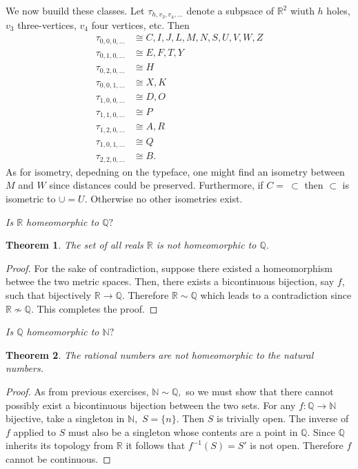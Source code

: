\documentclass[letter]{article}
\newtheorem{theorem}{Theorem}
\newenvironment{menumerate}{%
  \edef\backupindent{\the\parindent}%
  \enumerate%
  \setlength{\parindent}{\backupindent}%
}{\endenumerate}
\begin{document}
\begin{menumerate}
		We now buuild these classes. Let $\tau_{h,v_3,v_4,\dots}$ denote a subpsace of $\mathbb{R}^2$ wiuth $h$ holes, $v_3$ three-vertices, $v_4$ four vertices, etc. Then
		\begin{equation}
			\begin{aligned}
				\tau_{0,0,0,\dots} &\cong C,I,J,L,M,N,S,U,V,W,Z\\
				\tau_{0,1,0,\dots} &\cong E,F,T,Y \\
				\tau_{0,2,0,\dots} &\cong H \\ 
				\tau_{0,0,1,\dots} &\cong X,K \\
				\tau_{1,0,0,\dots} &\cong D,O \\
				\tau_{1,1,0,\dots} &\cong P \\
				\tau_{1,2,0,\dots} &\cong A,R\\
				\tau_{1,0,1,\dots} &\cong Q \\
				\tau_{2,2,0,\dots} &\cong B.
			\end{aligned}
		\end{equation}
		As for isometry, depedning on the typeface, one might find an isometry between $M$ and $W$ since distances could be preserved. Furthermore, if $C =\  \subset$ then $\subset$ is isometric to $\cup = U$. Otherwise no other isometries exist.
		\item  \textit{Is $\mathbb{R}$ homeomorphic to $\mathbb{Q}?$}
			\begin{theorem}
				The set of all reals $\mathbb{R}$ is not homeomorphic to $\mathbb{Q}$.
			\end{theorem}
			\begin{proof}
				For the sake of contradiction, suppose there existed a homeomorphism betwee the two metric spaces. Then, there exists a bicontinuous bijection, say $f$, such that bijectively $\mathbb{R}\to\mathbb{Q}$. Therefore $\mathbb{R} \sim \mathbb{Q}$ which leads to a contradiction since $\mathbb{R}\nsim\mathbb{Q}.$ This completes the proof.
			\end{proof}
		\item \textit{Is $\mathbb{Q}$ homeomorphic to $\mathbb{N}?$ }  
		\begin{theorem}
			The rational numbers are not homeomorphic to the natural numbers.
		\end{theorem}
		\begin{proof}
			As from previous exercises, $\mathbb{N} \sim \mathbb{Q},$ so we must show that there cannot possibly exist a bicontinuous bijection between the two sets. For any $f: \mathbb{Q} \to \mathbb{N}$ bijective,
			take a singleton in $\mathbb{N},$ $S= \{n\}.$ Then $S$ is trivially open. The inverse of $f$ applied to $S$ must also be a singleton whose contents are a point in $\mathbb{Q}.$ Since $\mathbb{Q}$ inherits its topology from $\mathbb{R}$ it follows that $f^{-1}(S) = S'$ is not open. Therefore $f$ cannot be continuous.


\end{proof}
\end{menumerate}
\end{document}
